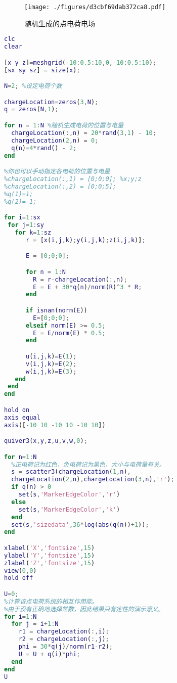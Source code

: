 

\begin{figure}[ht]
\centering
\texttt{[image: ./figures/d3cbf69dab372ca8.pdf]}
\caption{随机生成的点电荷电场} \label{fig_MLTEPD_1}
\end{figure}
\begin{lstlisting}[language=matlab]
clc
clear

[x y z]=meshgrid(-10:0.5:10,0,-10:0.5:10);
[sx sy sz] = size(x);

N=2; %设定电荷个数

chargeLocation=zeros(3,N);
q = zeros(N,1);

for n = 1:N %随机生成电荷的位置与电量
  chargeLocation(:,n) = 20*rand(3,1) - 10;
  chargeLocation(2,n) = 0;
  q(n)=4*rand() - 2;
end

%你也可以手动指定各电荷的位置与电量
%chargeLocation(:,1) = [0;0;0]; %x;y;z
%chargeLocation(:,2) = [0;0;5];
%q(1)=1;
%q(2)=-1;

for i=1:sx
 for j=1:sy
   for k=1:sz
      r = [x(i,j,k);y(i,j,k);z(i,j,k)];

      E = [0;0;0];

      for n = 1:N
        R = r-chargeLocation(:,n);
        E = E + 30*q(n)/norm(R)^3 * R;
      end

      if isnan(norm(E))
        E=[0;0;0];
      elseif norm(E) >= 0.5;
        E = E/norm(E) * 0.5;
      end

      u(i,j,k)=E(1);
      v(i,j,k)=E(2);
      w(i,j,k)=E(3);
   end
 end
end

hold on
axis equal
axis([-10 10 -10 10 -10 10])

quiver3(x,y,z,u,v,w,0);

for n=1:N
  %正电荷记为红色，负电荷记为黑色，大小与电荷量有关。
  s = scatter3(chargeLocation(1,n),
  chargeLocation(2,n),chargeLocation(3,n),'r');
  if q(n) > 0 
    set(s,'MarkerEdgeColor','r')
  else
    set(s,'MarkerEdgeColor','k')
  end
  set(s,'sizedata',36*log(abs(q(n))+1));
end

xlabel('X','fontsize',15)
ylabel('Y','fontsize',15)
zlabel('Z','fontsize',15)
view(0,0)
hold off

U=0; 
%计算该点电荷系统的相互作用能。
%由于没有正确地选择常数，因此结果只有定性的演示意义。
for i=1:N
  for j = i+1:N
    r1 = chargeLocation(:,i);
    r2 = chargeLocation(:,j);
    phi = 30*q(j)/norm(r1-r2);
    U = U + q(i)*phi;
  end
end
U
\end{lstlisting}
